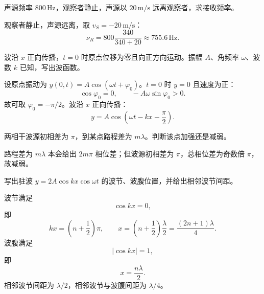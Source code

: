 \begin{exercise}[level=standard]
声源频率 $800\,\mathrm{Hz}$，观察者静止，声源以 $20\,\mathrm{m/s}$ 远离观察者，求接收频率。
\begin{solution}
观察者静止，声源远离，取 $v_S=-20\,\mathrm{m/s}$：
\[
  \nu_R=800\frac{340}{340+20}\approx755.6\,\mathrm{Hz}.
\]
\end{solution}
\end{exercise}

\begin{exercise}[level=advanced]
波沿 $x$ 正向传播，$t=0$ 时原点位移为零且向正方向运动。振幅 $A$、角频率 $\omega$、波数 $k$ 已知，写出波函数。
\begin{solution}
设原点振动为 $y(0,t)=A\cos(\omega t+\varphi_0)$。$t=0$ 时 $y=0$ 且速度为正：
\[
  \cos\varphi_0=0,\qquad -A\omega\sin\varphi_0>0.
\]
故可取 $\varphi_0=-\pi/2$。波沿 $x$ 正向传播：
\[
  y=A\cos\left(\omega t-kx-\frac{\pi}{2}\right).
\]
\end{solution}
\end{exercise}

\begin{exercise}[level=advanced]
两相干波源初相差为 $\pi$，到某点路程差为 $m\lambda$。判断该点加强还是减弱。
\begin{solution}
路程差为 $m\lambda$ 本会给出 $2m\pi$ 相位差；但波源初相差为 $\pi$，总相位差为奇数倍 $\pi$，故减弱。
\end{solution}
\end{exercise}

\begin{exercise}[level=standard]
写出驻波 $y=2A\cos kx\cos\omega t$ 的波节、波腹位置，并给出相邻波节间距。
\begin{solution}
波节满足
\[
  \cos kx=0,
\]
即
\[
  kx=\left(n+\frac12\right)\pi,\qquad
  x=\left(n+\frac12\right)\frac{\lambda}{2}
  =\frac{(2n+1)\lambda}{4}.
\]
波腹满足
\[
  |\cos kx|=1,
\]
即
\[
  x=\frac{n\lambda}{2}.
\]
相邻波节间距为 $\lambda/2$，相邻波节与波腹间距为 $\lambda/4$。
\end{solution}
\end{exercise}

